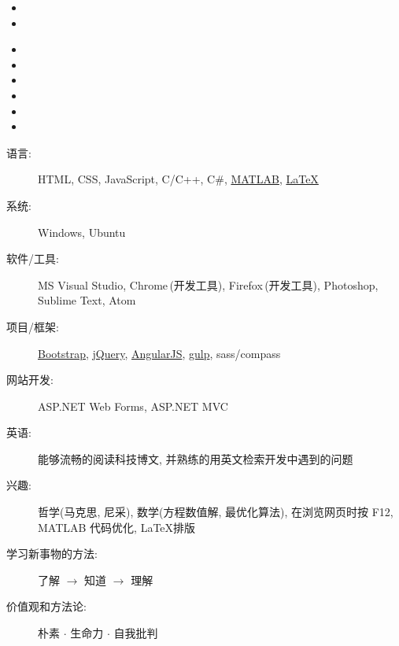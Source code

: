 \documentclass[letterpaper,11pt]{article}
\begin{document}
  \begin{itemize}
    \item
    \item
  \end{itemize}

\newpage

  \begin{itemize}
    \item {}
    \item {}
    \item {}
    \item {}
    \item {}
    \item {}
  \end{itemize}

  \begin{description}
    \item[语言:] HTML, CSS, JavaScript, C/C++, C\#, \href{http://cn.mathworks.com/products/matlab/}{MATLAB}, \href{http://www.latex-project.org/}{\LaTeX}
    \item[系统:] Windows, Ubuntu
    \item[软件/工具:] MS Visual Studio, Chrome$\,$(开发工具), Firefox$\,$(开发工具), Photoshop, Sublime Text, Atom
    \item[项目/框架:] \href{http://www.bootcss.com/}{Bootstrap}, \href{https://jquery.com/}{jQuery}, \href{https://angularjs.org/}{AngularJS}, \href{http://gulpjs.com/}{gulp}, sass/compass
    \item[网站开发:] ASP.NET Web Forms, ASP.NET MVC
    \item[英语:] 能够流畅的阅读科技博文, 并熟练的用英文检索开发中遇到的问题
  \end{description}

  \begin{description}
    \item[兴趣:] 哲学(马克思, 尼采), 数学(方程数值解, 最优化算法), 在浏览网页时按 F12, MATLAB 代码优化, \LaTeX 排版
    \item[学习新事物的方法:] 了解 $\rightarrow$ 知道 $\rightarrow$ 理解
    \item[价值观和方法论:] 朴素 $\cdot$ 生命力 $\cdot$ 自我批判
  \end{description}
\end{document}
